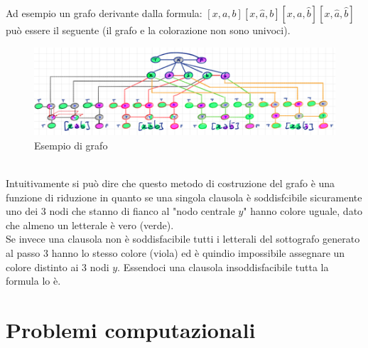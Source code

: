 \documentclass[a4paper]{article}
\begin{document}
Ad esempio un grafo derivante dalla formula: $[x,a,b][x,\hat a, b][x,a,\hat b][x, \hat a, \hat b]$ può essere il seguente (il grafo e la colorazione non sono univoci).
		\begin{figure}[!ht]
		\centering
		\includegraphics[width = 1\textwidth]{./img/E10_finale.png}
		\caption{Esempio di grafo} \label{FIG:E10_finale}
		\end{figure}\\
Intuitivamente si può dire che questo metodo di costruzione del grafo è una funzione di riduzione in quanto se una singola clausola è soddisfcibile sicuramente uno dei 3 nodi che stanno di fianco al "nodo centrale $y$" hanno colore uguale, dato che almeno un letterale è vero (verde).\\
Se invece una clausola non è soddisfacibile tutti i letterali del sottografo generato al passo 3 hanno lo stesso colore (viola) ed è quindio impossibile assegnare un colore distinto ai 3 nodi $y$.
Essendoci una clausola insoddisfacibile tutta la formula lo è.
\section{Problemi computazionali}
\end{document}
